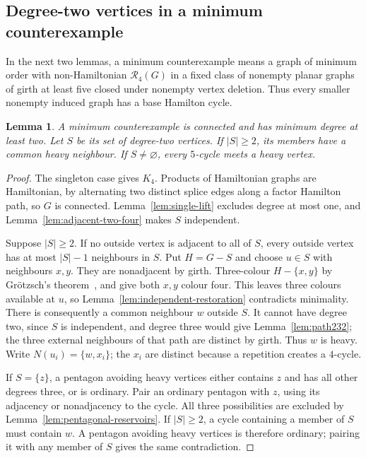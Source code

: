 \documentclass[11pt]{article}
\newtheorem{lemma}[theorem]{Lemma}
\theoremstyle{remark}
\newcommand{\R}{\mathcal R}
\numberwithin{equation}{section}
\numberwithin{table}{section}
\begin{document}
\subsection{Degree-two vertices in a minimum counterexample}

In the next two lemmas, a minimum counterexample means a graph of minimum
order with non-Hamiltonian $\R_4(G)$ in a fixed class of nonempty planar
graphs of girth at least five closed under nonempty vertex deletion.
Thus every smaller nonempty induced graph has a base Hamilton cycle.

\begin{lemma}\label{lem:degree-two-counterexample}
A minimum counterexample is connected and has minimum degree at least two.
Let $S$ be its set of degree-two vertices. If $|S|\ge2$, its members have
a common heavy neighbour. If $S\ne\varnothing$, every $5$-cycle meets a
heavy vertex.
\end{lemma}
\begin{proof}
The singleton case gives $K_4$. Products of Hamiltonian graphs are
Hamiltonian, by alternating two distinct splice edges along a factor
Hamilton path, so $G$ is connected. Lemma~\ref{lem:single-lift} excludes
degree at most one, and Lemma~\ref{lem:adjacent-two-four} makes $S$
independent.

Suppose $|S|\ge2$. If no outside vertex is adjacent to all of $S$, every
outside vertex has at most $|S|-1$ neighbours in $S$. Put $H=G-S$ and
choose $u\in S$ with neighbours $x,y$. They are nonadjacent by girth.
Three-colour $H-\{x,y\}$ by Gr\"otzsch's theorem~\cite{Grotzsch59}, and
give both $x,y$ colour four. This leaves three colours available at $u$,
so Lemma~\ref{lem:independent-restoration} contradicts minimality.
There is consequently a common neighbour $w$ outside $S$. It cannot have
degree two, since $S$ is independent, and degree three would give
Lemma~\ref{lem:path232}; the three external neighbours of that path
are distinct by girth. Thus $w$ is heavy. Write $N(u_i)=\{w,x_i\}$; the $x_i$ are distinct
because a repetition creates a $4$-cycle.

If $S=\{z\}$, a pentagon avoiding heavy vertices either contains $z$
and has all other degrees three, or is ordinary. Pair an ordinary pentagon
with $z$, using its adjacency or nonadjacency to the cycle. All three
possibilities are excluded by Lemma~\ref{lem:pentagonal-reservoirs}.
If $|S|\ge2$, a cycle containing a member of $S$ must contain $w$.
A pentagon avoiding heavy vertices is therefore ordinary; pairing it with
any member of $S$ gives the same contradiction.
\end{proof}
\end{document}
